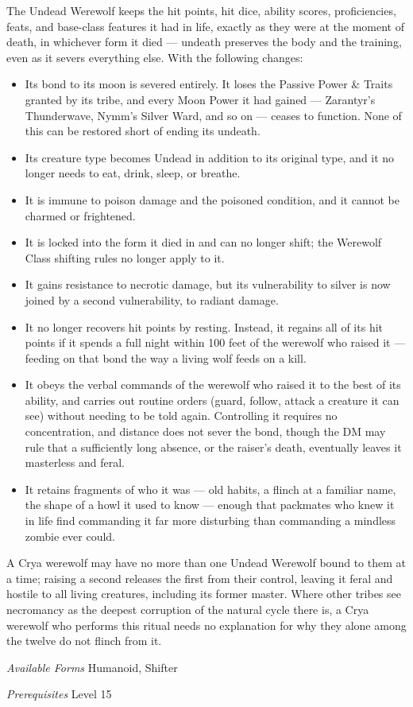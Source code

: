 \documentclass[twocolumn]{dndbook}
\begin{document}
The Undead Werewolf keeps the hit points, hit dice, ability scores, proficiencies, feats, and base-class features it had in life, exactly as they were at the moment of death, in whichever form it died --- undeath preserves the body and the training, even as it severs everything else.
With the following changes:
\begin{itemize}
    \item Its bond to its moon is severed entirely. It loses the Passive Power \& Traits granted by its tribe, and every Moon Power it had gained --- Zarantyr's Thunderwave, Nymm's Silver Ward, and so on --- ceases to function. None of this can be restored short of ending its undeath.
    \item Its creature type becomes Undead in addition to its original type, and it no longer needs to eat, drink, sleep, or breathe.
    \item It is immune to poison damage and the poisoned condition, and it cannot be charmed or frightened.
    \item It is locked into the form it died in and can no longer shift; the Werewolf Class shifting rules no longer apply to it.
    \item It gains resistance to necrotic damage, but its vulnerability to silver is now joined by a second vulnerability, to radiant damage.
    \item It no longer recovers hit points by resting. Instead, it regains all of its hit points if it spends a full night within 100 feet of the werewolf who raised it --- feeding on that bond the way a living wolf feeds on a kill.
    \item It obeys the verbal commands of the werewolf who raised it to the best of its ability, and carries out routine orders (guard, follow, attack a creature it can see) without needing to be told again. Controlling it requires no concentration, and distance does not sever the bond, though the DM may rule that a sufficiently long absence, or the raiser's death, eventually leaves it masterless and feral.
    \item It retains fragments of who it was --- old habits, a flinch at a familiar name, the shape of a howl it used to know --- enough that packmates who knew it in life find commanding it far more disturbing than commanding a mindless zombie ever could.
\end{itemize}

A Crya werewolf may have no more than one Undead Werewolf bound to them at a time; raising a second releases the first from their control, leaving it feral and hostile to all living creatures, including its former master.
Where other tribes see necromancy as the deepest corruption of the natural cycle there is, a Crya werewolf who performs this ritual needs no explanation for why they alone among the twelve do not flinch from it.\par
\emph{Available Forms} Humanoid, Shifter\par
\emph{Prerequisites} Level 15\par
\end{document}

